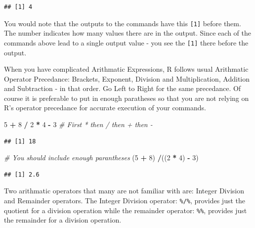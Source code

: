 \documentclass[]{krantz}
\makeatletter
\newenvironment{Shaded}{\begin{snugshade}}{\end{snugshade}}
\newcommand{\DecValTok}[1]{\textcolor[rgb]{0.06,0.06,0.06}{#1}}
\newcommand{\StringTok}[1]{\textcolor[rgb]{0.5,0.5,0.5}{#1}}
\newcommand{\CommentTok}[1]{\textcolor[rgb]{0.56,0.35,0.01}{\textit{#1}}}
\newcommand{\OperatorTok}[1]{\textcolor[rgb]{0.81,0.36,0.00}{\textbf{#1}}}
\newcommand{\NormalTok}[1]{#1}
\newenvironment{kframe}{%
\medskip{}
\setlength{\fboxsep}{.8em}
 \def\at@end@of@kframe{}%
 \ifinner\ifhmode%
  \def\at@end@of@kframe{\end{minipage}}%
  \begin{minipage}{\columnwidth}%
 \fi\fi%
 \def\FrameCommand##1{\hskip\@totalleftmargin \hskip-\fboxsep
 \colorbox{shadecolor}{##1}\hskip-\fboxsep
     \hskip-\linewidth \hskip-\@totalleftmargin \hskip\columnwidth}%
 \MakeFramed {\advance\hsize-\width
   \@totalleftmargin\z@ \linewidth\hsize
   \@setminipage}}%
 {\par\unskip\endMakeFramed%
 \at@end@of@kframe}
\renewenvironment{Shaded}{\begin{kframe}}{\end{kframe}}
\theoremstyle{definition}
\theoremstyle{definition}
\theoremstyle{definition}
\theoremstyle{remark}
\makeatother
\begin{document}
\begin{verbatim}
## [1] 4
\end{verbatim}

You would note that the outputs to the commands have this
\texttt{{[}1{]}} before them. The number indicates how many values there
are in the output. Since each of the commands above lead to a single
output value - you see the \texttt{{[}1{]}} there before the output.

When you have complicated Arithmatic Expressions, R follows usual
Arithmatic Operator Precedance: Brackets, Exponent, Division and
Multiplication, Addition and Subtraction - in that order. Go Left to
Right for the same precedance. Of course it is preferable to put in
enough paratheses so that you are not relying on R's operator precedance
for accurate execution of your commands.

\begin{Shaded}
\begin{Highlighting}[]
\DecValTok{5} \OperatorTok{+}\StringTok{ }\DecValTok{8} \OperatorTok{/}\StringTok{ }\DecValTok{2} \OperatorTok{*}\StringTok{ }\DecValTok{4} \OperatorTok{-}\StringTok{ }\DecValTok{3} \CommentTok{# First * then / then + then - }
\end{Highlighting}
\end{Shaded}

\begin{verbatim}
## [1] 18
\end{verbatim}

\begin{Shaded}
\begin{Highlighting}[]
\CommentTok{# You should include enough parantheses}
\NormalTok{(}\DecValTok{5} \OperatorTok{+}\StringTok{ }\DecValTok{8}\NormalTok{) }\OperatorTok{/}\NormalTok{((}\DecValTok{2} \OperatorTok{*}\StringTok{ }\DecValTok{4}\NormalTok{) }\OperatorTok{-}\StringTok{ }\DecValTok{3}\NormalTok{)}
\end{Highlighting}
\end{Shaded}

\begin{verbatim}
## [1] 2.6
\end{verbatim}

Two arithmatic operators that many are not familiar with are: Integer
Division and Remainder operators. The Integer Division operator:
\texttt{\%/\%}, provides just the quotient for a division operation
while the remainder operator: \texttt{\%\%}, provides just the remainder
for a division operation.
\end{document}
